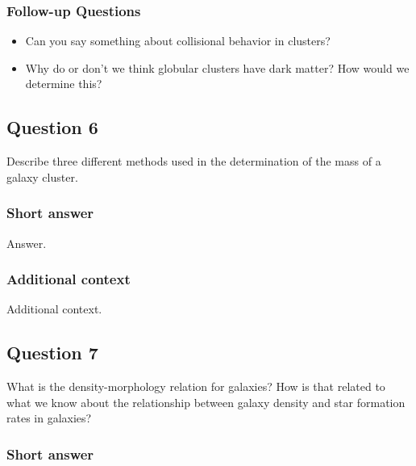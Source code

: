 \documentclass[a4paper,11pt]{article}
\begin{document}
\subsubsection{Follow-up Questions}

\begin{itemize}
    \item Can you say something about collisional behavior in clusters?
    \item Why do or don't we think globular clusters have dark matter? How would we determine this? 
\end{itemize}


\newpage
\subsection{Question 6}

Describe three different methods used in the determination of the mass of a galaxy cluster.

\subsubsection{Short answer}

Answer.

\subsubsection{Additional context}

Additional context.


\newpage
\subsection{Question 7}

What is the density-morphology relation for galaxies? How is that related to what we know about the relationship between galaxy density and star formation rates in galaxies?

\subsubsection{Short answer}
\end{document}
